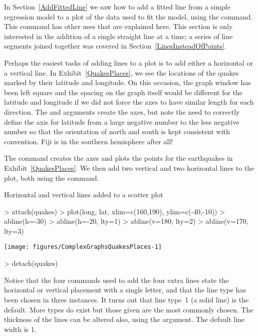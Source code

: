 In Section~\ref{AddFittedLine} we saw how to add a fitted line from a simple regression model to a plot of the data used to fit the model, using the  command. This command has other uses that are explained here. This section is only interested in the addition of a single straight line at a time; a series of line segments joined together was covered in Section~\ref{LinesInsteadOfPoints}. 
 
Perhaps the easiest tasks of adding lines to a plot is to add either a horizontal or a vertical line. In Exhibit~\ref{QuakesPlaces}, we see the locations of the quakes marked by their latitude and longitude. On this occasion, the graph window has been left square and the spacing on the graph itself would be different for the latitude and longitude if we did not force the axes to have similar length for each direction. The  and  arguments create the axes, but note the need to correctly define the axis for latitude from a large negative number to the less negative number so that the orientation of north and south is kept consistent with convention. Fiji is in the southern hemisphere after all! 
 
The  command creates the axes and plots the points for the earthquakes in Exhibit~\ref{QuakesPlaces}. We then add two vertical and two horizontal lines to the plot, both using the  command. 
\begin{exhibit} 
\begin{center} 
\caption{Horizontal and vertical lines added to a scatter plot} 
\label{QuakesPlaces} 
\begin{Schunk}
\begin{Sinput}
> attach(quakes) 
> plot(long, lat, xlim=c(160,190), ylim=c(-40,-10)) 
> abline(h=-30) 
> abline(h=-20, lty=1) 
> abline(v=180, lty=2) 
> abline(v=170, lty=3) 
\end{Sinput}

\texttt{[image: figures/ComplexGraphsQuakesPlaces-1]} \begin{Sinput}
> detach(quakes) 
\end{Sinput}
\end{Schunk}
\end{center} 
\end{exhibit} 
Notice that the four commands used to add the four extra lines state the horizontal or vertical placement with a single letter, and that the line type has been chosen in three instances. It turns out that line type~1 (a solid line) is the default. More types do exist but those given are the most commonly chosen. The thickness of the lines can be altered also, using the  argument. The default line width is 1. 
 
